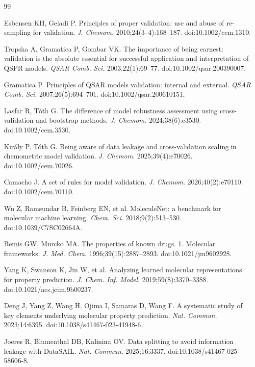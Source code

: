 \begin{thebibliography}{99}

Esbensen KH, Geladi P. Principles of proper validation: use and abuse of re-sampling for validation. \textit{J. Chemom.} 2010;24(3--4):168--187. doi:10.1002/cem.1310.

Tropsha A, Gramatica P, Gombar VK. The importance of being earnest: validation is the absolute essential for successful application and interpretation of QSPR models. \textit{QSAR Comb. Sci.} 2003;22(1):69--77. doi:10.1002/qsar.200390007.

Gramatica P. Principles of QSAR models validation: internal and external. \textit{QSAR Comb. Sci.} 2007;26(5):694--701. doi:10.1002/qsar.200610151.

Lasfar R, T\'{o}th G. The difference of model robustness assessment using cross-validation and bootstrap methods. \textit{J. Chemom.} 2024;38(6):e3530. doi:10.1002/cem.3530.

Kir\'{a}ly P, T\'{o}th G. Being aware of data leakage and cross-validation scaling in chemometric model validation. \textit{J. Chemom.} 2025;39(4):e70026. doi:10.1002/cem.70026.

Camacho J. A set of rules for model validation. \textit{J. Chemom.} 2026;40(2):e70110. doi:10.1002/cem.70110.

Wu Z, Ramsundar B, Feinberg EN, et al. MoleculeNet: a benchmark for molecular machine learning. \textit{Chem. Sci.} 2018;9(2):513--530. doi:10.1039/C7SC02664A.

Bemis GW, Murcko MA. The properties of known drugs. 1. Molecular frameworks. \textit{J. Med. Chem.} 1996;39(15):2887--2893. doi:10.1021/jm9602928.

Yang K, Swanson K, Jin W, et al. Analyzing learned molecular representations for property prediction. \textit{J. Chem. Inf. Model.} 2019;59(8):3370--3388. doi:10.1021/acs.jcim.9b00237.

Deng J, Yang Z, Wang H, Ojima I, Samaras D, Wang F. A systematic study of key elements underlying molecular property prediction. \textit{Nat. Commun.} 2023;14:6395. doi:10.1038/s41467-023-41948-6.

Joeres R, Blumenthal DB, Kalinina OV. Data splitting to avoid information leakage with DataSAIL. \textit{Nat. Commun.} 2025;16:3337. doi:10.1038/s41467-025-58606-8.


\end{thebibliography}
